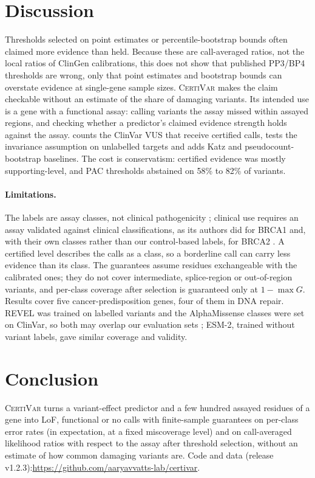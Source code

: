 \section{Discussion}\label{sec:discussion}

Thresholds selected on point estimates or percentile-bootstrap bounds often claimed more evidence than held. Because
these are call-averaged ratios, not the local ratios of ClinGen calibrations, this does not show that published PP3/BP4
thresholds are wrong, only that point estimates and bootstrap bounds can overstate evidence at single-gene sample sizes.
\textsc{CertiVar} makes the claim checkable without an estimate of the share of damaging variants. Its intended use is a
gene with a functional assay: calling variants the assay missed within assayed regions, and checking whether a predictor's claimed evidence strength holds against the assay.
 counts the ClinVar VUS that receive certified calls, tests the invariance assumption on unlabelled
targets and adds Katz and pseudocount-bootstrap baselines. The cost is conservatism: certified evidence was mostly
supporting-level, and PAC thresholds abstained on 58\% to 82\% of variants.

\paragraph{Limitations.}
The labels are assay classes, not clinical pathogenicity \cite{Brnich2020}; clinical use requires an assay validated
against clinical classifications, as its authors did for BRCA1 \cite{Findlay2018} and, with their own classes rather
than our control-based labels, for BRCA2 \cite{Huang2025}. A certified level describes the calls as a class, so a
borderline call can carry less evidence than its class. The guarantees assume residues exchangeable with the calibrated
ones; they do not cover intermediate, splice-region or out-of-region variants, and per-class coverage after selection is
guaranteed only at $1-\max G$. Results cover five cancer-predisposition genes, four of them in DNA repair. REVEL was
trained on labelled variants and the AlphaMissense classes were set on ClinVar, so both may overlap our evaluation sets
\cite{Ioannidis2016,Grimm2015}; ESM-2, trained without variant labels, gave similar coverage and validity.

\section{Conclusion}\label{sec:conclusion}
\textsc{CertiVar} turns a variant-effect predictor and a few hundred assayed residues of a gene into LoF, functional or
no calls with finite-sample guarantees on per-class error rates (in expectation, at a fixed miscoverage level) and on call-averaged
likelihood ratios with respect to the assay after threshold selection, without an estimate of how common damaging
variants are. Code and data (release v1.2.3):\newline\url{https://github.com/aaryavvatts-lab/certivar}.
